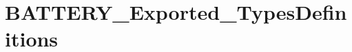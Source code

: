 \hypertarget{group___b_a_t_t_e_r_y___exported___types_definitions}{}\section{B\+A\+T\+T\+E\+R\+Y\+\_\+\+Exported\+\_\+\+Types\+Definitions}
\label{group___b_a_t_t_e_r_y___exported___types_definitions}
